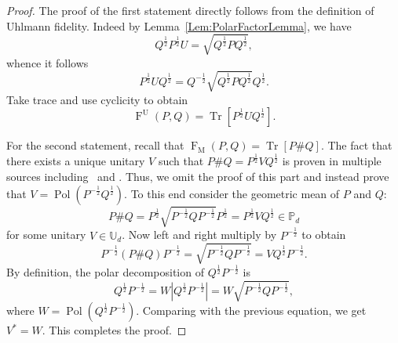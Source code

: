 \documentclass[12pt]{article}
\theoremstyle{definition}
\begin{document}
\begin{proof}
The proof of the first statement directly follows from the definition of Uhlmann fidelity. Indeed by Lemma~\ref{Lem:PolarFactorLemma}, we have
\begin{equation} Q^{\frac 12} P^{\frac 12} U = \sqrt{Q^{\frac 12} P Q^{\frac 12}}, \end{equation}
whence it follows
\begin{equation} P^{\frac 12} U Q^{\frac 12} = Q^{-\frac 12} \sqrt{Q^{\frac 12} P Q^{\frac 12}} Q^{\frac 12}. \end{equation}
Take trace and use cyclicity to obtain 
    \begin{equation} 
    \operatorname{F}^\mathrm{U}(P, Q) = \operatorname{Tr}\left[P^{\frac 12} U Q^{\frac12} \right]. 
    \end{equation}

For the second statement, recall that $\operatorname{F}_\mathrm{M}(P, Q) = \operatorname{Tr}[P \# Q].$ The fact that there exists a unique unitary $V$ such that $P \# Q = P^{\frac 12} V Q^{\frac 12}$ is proven in multiple sources including~\cite[Proposition 4.1.8]{bhatia2009positive} and \cite{cree2020fidelity}. Thus, we omit the proof of this part and instead prove that $V = \operatorname{Pol}(P^{-\frac 12} Q^{\frac 12}).$ To this end consider the geometric mean of $P$ and $Q$:
\begin{equation} P \# Q = P^{\frac 12} \sqrt{P^{-\frac 12} Q P^{-\frac 12}} P^{\frac 12} = P^{\frac 12} V Q^{\frac 12} \in \mathbb{P}_d \end{equation}
for some unitary $V \in \mathbb{U}_d$. Now left and right multiply by $P^{-\frac 12}$ to obtain
\begin{equation} P^{-\frac 12} (P \# Q) P^{-\frac 12} = \sqrt{P^{-\frac 12} Q P^{-\frac 12}} = V Q^{\frac 12} P^{-\frac 12}. \end{equation}
By definition, the polar decomposition of $Q^{\frac 12} P^{-\frac 12}$ is
\begin{equation} Q^{\frac 12} P^{-\frac 12} = W \left|Q^{\frac 12} P^{-\frac 12}\right| = W \sqrt{P^{-\frac 12} Q P^{-\frac 12}}, \end{equation}
where $W = \operatorname{Pol}\left(Q^{\frac 12} P^{-\frac 12}\right).$ Comparing with the previous equation, we get $V^* = W$. This completes the proof.
\end{proof}
\end{document}
